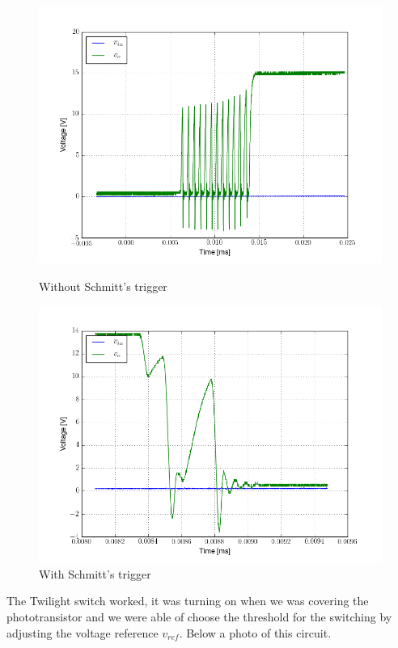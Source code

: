 \begin{figure}[H]
\begin{minipage}{.5\textwidth}
\centering
\includegraphics[width=\textwidth]{5/noise.png}
\caption{Without Schmitt's trigger}
\end{minipage}%
\begin{minipage}{.5\textwidth}
\centering
\includegraphics[width=\textwidth]{5/schmitt.png}
\caption{With Schmitt's trigger}
\end{minipage}
\end{figure}
The Twilight switch worked, it was turning on when we was covering the phototransistor and we were able of choose the threshold for the switching by adjusting the voltage reference $v_{ref}$. Below a photo of this circuit. 
